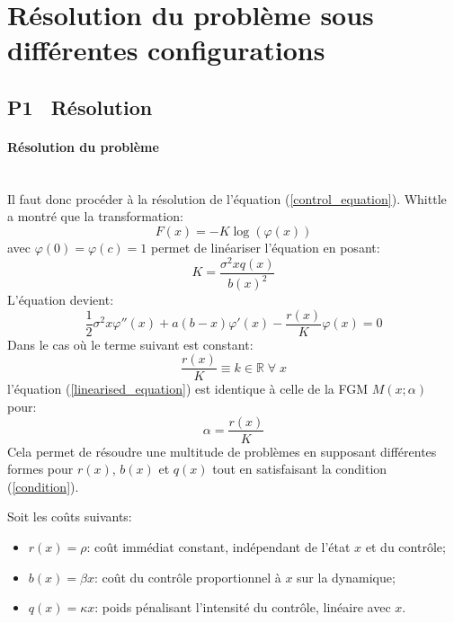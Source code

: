 \section{Résolution du problème sous différentes configurations}
\subsection{P1 \textemdash~Résolution}\label{p1}
\paragraph{Résolution du problème}\phantom{}\\
Il faut donc procéder à la résolution de l'équation (\ref{control_equation}). Whittle~\cite{whittle1982} a montré que la transformation: 
\[F(x)=-K\log(\varphi(x))\]
avec $\varphi(0)=\varphi(c)=1$ permet de linéariser l'équation en posant:
\[
K=\frac{\sigma^2xq(x)}{{b(x)}^2}
\]
L'équation devient:
\begin{equation}\label{linearised_equation}
    \frac{1}{2}\sigma^2 x\varphi''(x) + a(b - x)\varphi'(x) - \frac{r(x)}{K}\varphi(x) = 0
\end{equation}
Dans le cas où le terme suivant est constant:
\begin{equation}\label{condition}
    \frac{r(x)}{K}\equiv k\in\mathds{R}\;\forall\;x
\end{equation}
l'équation (\ref{linearised_equation}) est identique à celle de la \acl{FGM} $M(x;\alpha)$ pour:
\[
\alpha=\frac{r(x)}{K}
\]
Cela permet de résoudre une multitude de problèmes en supposant différentes formes pour $r(x)$, $b(x)$ et $q(x)$ tout en satisfaisant la condition (\ref{condition}). 

Soit les coûts suivants:
\begin{itemize}
    \item $r(x) = \rho$: coût immédiat constant, indépendant de l'état $x$ et du contrôle;
    \item $b(x) = \beta x$: coût du contrôle proportionnel à $x$ sur la dynamique;
    \item $q(x) = \kappa x$: poids pénalisant l'intensité du contrôle, linéaire avec $x$.
\end{itemize}

